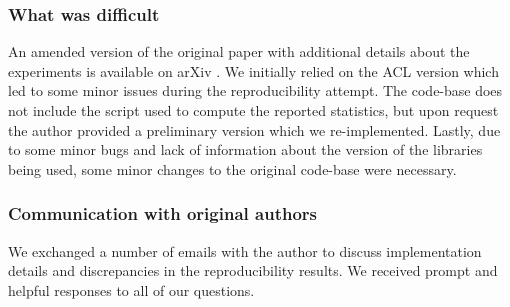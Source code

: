 \subsubsection*{What was difficult}
An amended version of the original paper with additional details about the experiments is available on arXiv \citep{garcia:arxiv}. We initially relied on the ACL \citep{garcia:acl} version which led to some minor issues during the reproducibility attempt. The code-base does not include the script used to compute the reported statistics, but upon request the author provided a preliminary version which we re-implemented. Lastly, due to some minor bugs and lack of information about the version of the libraries being used, some minor changes to the original code-base were necessary.

\subsubsection*{Communication with original authors}
We exchanged a number of emails with the author to discuss implementation details and discrepancies in the reproducibility results. We received prompt and helpful responses to all of our questions.
